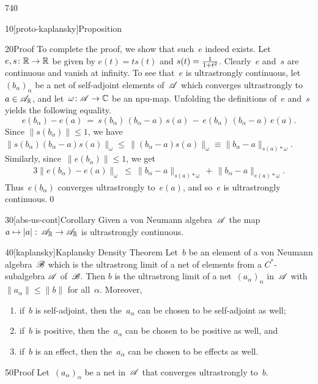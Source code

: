 \begin{parsec}{740}
\begin{point}{10}[proto-kaplansky]{Proposition}
\begin{point}{20}{Proof}
To complete the proof,
we show that such~$e$ indeed exists.
Let $e,s\colon \mathbb{R}\to\mathbb{R}$ 
be given by $e(t)=ts(t)$ and $s(t)=\smash{\frac{1}{1+t^2}}$.
Clearly~$e$ and~$s$
are continuous
and
vanish at infinity.
To see that~$e$ is ultrastrongly continuous,
let $(b_\alpha)_\alpha$ be a net of self-adjoint elements of~$\mathscr{A}$
which converges ultrastrongly to $a\in\mathscr{A}_{\mathbb{R}}$,
and let~$\omega\colon \mathscr{A}\to \mathbb{C}$
be an npu-map. 
Unfolding the definitions
of~$e$ and~$s$ yields
the following equality.
\begin{equation*}
e(b_\alpha)-e(a) \ =\ s(b_\alpha)\,(b_\alpha-a)\,s(a)
\,-\, e(b_\alpha)\,(b_\alpha-a)\,e(a).
\end{equation*}
Since $\|s(b_\alpha)\|\leq 1$,
we have $\|s(b_\alpha)(b_\alpha-a)s(a)\|_\omega 
\leq  \,\|(b_\alpha-a)s(a)\|_\omega
\equiv \|b_\alpha-a\|_{s(a)*\omega}$.
Similarly, since~$\|e(b_\alpha)\|\leq 1$,
we get
\begin{alignat*}{3}
\|e(b_\alpha)-e(a)\|_\omega
\ \leq\ \|b_\alpha-a\|_{s(a)*\omega}\,+\,\|b_\alpha-a\|_{e(a)*\omega}.
\end{alignat*}
Thus~$e(b_\alpha)$ converges ultrastrongly to~$e(a)$,
and so~$e$ is ultrastrongly continuous.\qed
\end{point}
\end{point}

\begin{point}{30}[abs-us-cont]{Corollary}%
Given a von Neumann algebra~$\mathscr{A}$
the map $a\mapsto\left|a\right|\colon\,\mathscr{A}_{\mathbb{R}}\to\mathscr{A}_{\mathbb{R}}$
is ultrastrongly continuous.
\end{point}
\begin{point}{40}[kaplansky]{Kaplansky Density Theorem}%
Let~$b$ be an element of a von Neumann algebra~$\mathscr{B}$
which is the ultrastrong limit of a net
of elements
from a $C^*$-subalgebra $\mathscr{A}$ of~$\mathscr{B}$.
Then
$b$ is the ultrastrong limit of a net~$(a_\alpha)_\alpha$
in~$\mathscr{A}$ with~$\|a_\alpha\|\leq\|b\|$ for all~$\alpha$.
Moreover,
\begin{enumerate}
\item
if~$b$ is self-adjoint,
then the~$a_\alpha$ can be chosen to be self-adjoint as well;
\item
if~$b$ is positive,
then the~$a_\alpha$ can be chosen to be positive as well, and
\item
if~$b$ is an effect,
then the~$a_\alpha$ can be chosen to be effects as well.
\end{enumerate}
\begin{point}{50}{Proof}%
Let~$(a_\alpha)_\alpha$
be a net in~$\mathscr{A}$ that converges ultrastrongly
to~$b$.


\end{point}
\end{point}
\end{parsec}
